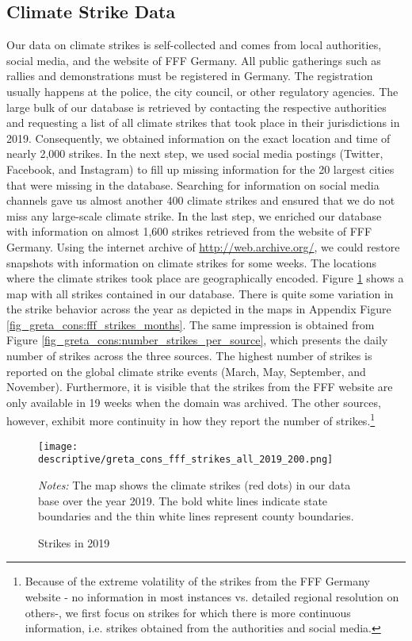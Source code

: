 \subsection{Climate Strike Data}
Our data on climate strikes is self-collected and comes from local authorities, social media, and the website of FFF Germany. All public gatherings such as rallies and demonstrations must be registered in Germany. The registration usually happens at the police, the city council, or other regulatory agencies. The large bulk of our database is retrieved by contacting the respective authorities and requesting a list of all climate strikes that took place in their jurisdictions in 2019. Consequently, we obtained information on the exact location and time of nearly 2,000 strikes. In the next step, we used social media postings (Twitter, Facebook, and Instagram) to fill up missing information for the 20 largest cities that were missing in the database. Searching for information on social media channels gave us almost another 400 climate strikes and ensured that we do not miss any large-scale climate strike. In the last step, we enriched our database with information on almost 1,600 strikes retrieved from the website of FFF Germany. Using the internet archive of \url{http://web.archive.org/}, we could restore snapshots with information on climate strikes for some weeks. The locations where the climate strikes took place are geographically encoded. Figure \ref{fig_greta_cons:fff_strikes_2019} shows a map with all strikes contained in our database. There is quite some variation in the strike behavior across the year as depicted in the maps in Appendix Figure \ref{fig_greta_cons:fff_strikes_months}. The same impression is obtained from Figure \ref{fig_greta_cons:number_strikes_per_source}, which presents the daily number of strikes across the three sources. The highest number of strikes is reported on the global climate strike events (March, May, September, and November). Furthermore, it is visible that the strikes from the FFF website are only available in 19 weeks when the domain was archived. The other sources, however, exhibit more continuity in how they report the number of strikes.\footnote{Because of the extreme volatility of the strikes from the FFF Germany website - no information in most instances vs. detailed regional resolution on others-, we first focus on strikes for which there is more continuous information, i.e. strikes obtained from the authorities and social media.} 


\begin{figure}[t]\centering
	\caption{Strikes in 2019}\label{fig_greta_cons:fff_strikes_2019}
	\texttt{[image: descriptive/greta\_cons\_fff\_strikes\_all\_2019\_200.png]}
	\begin{minipage}{0.8\linewidth}
		\scriptsize{\emph{Notes:} The map shows the climate strikes (red dots) in our data base over the year 2019. The bold white lines indicate state boundaries and the thin white lines represent county boundaries.}
	\end{minipage}
\end{figure}


